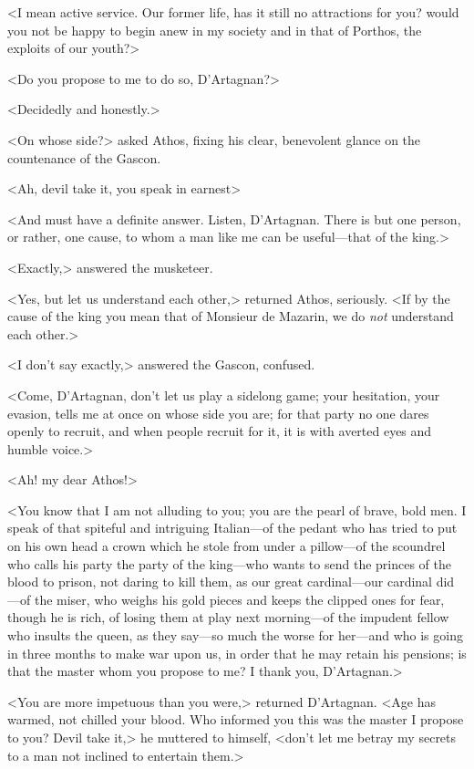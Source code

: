 <I mean active service. Our former life, has it still no attractions for you? would you not be happy to begin anew in my society and in that of Porthos, the exploits of our youth?>

<Do you propose to me to do so, D'Artagnan?>

<Decidedly and honestly.>

<On whose side?> asked Athos, fixing his clear, benevolent glance on the countenance of the Gascon.

<Ah, devil take it, you speak in earnest\longdash>

<And must have a definite answer. Listen, D'Artagnan. There is but one person, or rather, one cause, to whom a man like me can be useful—that of the king.>

<Exactly,> answered the musketeer.

<Yes, but let us understand each other,> returned Athos, seriously. <If by the cause of the king you mean that of Monsieur de Mazarin, we do \textit{not} understand each other.>

<I don't say exactly,> answered the Gascon, confused.

<Come, D'Artagnan, don't let us play a sidelong game; your hesitation, your evasion, tells me at once on whose side you are; for that party no one dares openly to recruit, and when people recruit for it, it is with averted eyes and humble voice.>

<Ah! my dear Athos!>

<You know that I am not alluding to you; you are the pearl of brave, bold men. I speak of that spiteful and intriguing Italian—of the pedant who has tried to put on his own head a crown which he stole from under a pillow—of the scoundrel who calls his party the party of the king—who wants to send the princes of the blood to prison, not daring to kill them, as our great cardinal—our cardinal did—of the miser, who weighs his gold pieces and keeps the clipped ones for fear, though he is rich, of losing them at play next morning—of the impudent fellow who insults the queen, as they say—so much the worse for her—and who is going in three months to make war upon us, in order that he may retain his pensions; is that the master whom you propose to me? I thank you, D'Artagnan.>

<You are more impetuous than you were,> returned D'Artagnan. <Age has warmed, not chilled your blood. Who informed you this was the master I propose to you? Devil take it,> he muttered to himself, <don't let me betray my secrets to a man not inclined to entertain them.>

